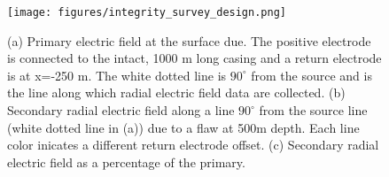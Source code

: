 \begin{figure}
    \begin{center}
    \texttt{[image: figures/integrity\_survey\_design.png]}
    \end{center}
\caption{
    (a) Primary electric field at the surface due.
    The positive electrode is connected to the intact,
    1000 m long casing and a return electrode is at x=-250 m. The white dotted
    line is $90^\circ$ from the source and is the line along which radial electric field
    data are collected.
    (b) Secondary radial electric field along a line $90^{\circ}$ from the source line (white dotted line in (a))
    due to a flaw at 500m depth. Each line color inicates a different return electrode offset.
    (c) Secondary radial electric field as a percentage of the primary.
}
\label{fig:integrity_survey_design}
\end{figure}
